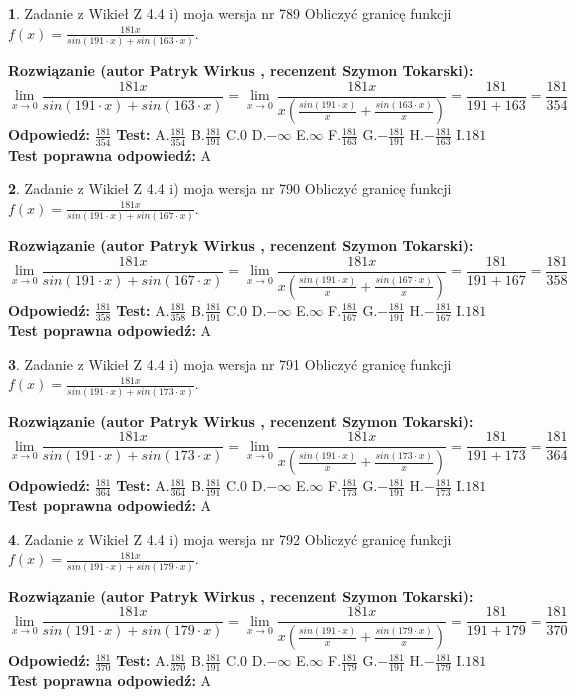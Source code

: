 \documentclass[12pt, a4paper]{article}
\theoremstyle{definition} %
\newtheorem{zad}{}
\newcommand{\zadStart}[1]{\begin{zad}#1\newline}
\newcommand{\zadStop}{\end{zad}}
\newcommand{\rozwStart}[2]{\noindent \textbf{Rozwiązanie (autor #1 , recenzent #2): }\newline}
\newcommand{\rozwStop}{\newline}
\newcommand{\odpStart}{\noindent \textbf{Odpowiedź:}\newline}
\newcommand{\odpStop}{\newline}
\newcommand{\testStart}{\noindent \textbf{Test:}\newline}
\newcommand{\testStop}{\newline}
\newcommand{\kluczStart}{\noindent \textbf{Test poprawna odpowiedź:}\newline}
\newcommand{\kluczStop}{\newline}
\begin{document}
\zadStart{Zadanie z Wikieł Z 4.4 i) moja wersja nr 789}
Obliczyć granicę funkcji $f(x)=\frac{181x}{sin(191\cdot x) +sin(163\cdot x)}$.
\zadStop
\rozwStart{Patryk Wirkus}{Szymon Tokarski}
$$\lim\limits_{x\to 0}\frac{181x}{sin(191\cdot x) +sin(163\cdot x)}=\lim\limits_{x\to 0}\frac{181x}{x(\frac{sin(191\cdot x)}{x}+\frac{sin(163\cdot x)}{x})}=\frac{181}{191+163} = \frac{181}{354}$$
\rozwStop
\odpStart
$\frac{181}{354}$
\odpStop
\testStart
A.$\frac{181}{354}$
B.$\frac{181}{191}$
C.$0$
D.$-\infty$
E.$\infty$
F.$\frac{181}{163}$
G.$-\frac{181}{191}$
H.$-\frac{181}{163}$
I.$181$
\testStop
\kluczStart
A
\kluczStop



\zadStart{Zadanie z Wikieł Z 4.4 i) moja wersja nr 790}
Obliczyć granicę funkcji $f(x)=\frac{181x}{sin(191\cdot x) +sin(167\cdot x)}$.
\zadStop
\rozwStart{Patryk Wirkus}{Szymon Tokarski}
$$\lim\limits_{x\to 0}\frac{181x}{sin(191\cdot x) +sin(167\cdot x)}=\lim\limits_{x\to 0}\frac{181x}{x(\frac{sin(191\cdot x)}{x}+\frac{sin(167\cdot x)}{x})}=\frac{181}{191+167} = \frac{181}{358}$$
\rozwStop
\odpStart
$\frac{181}{358}$
\odpStop
\testStart
A.$\frac{181}{358}$
B.$\frac{181}{191}$
C.$0$
D.$-\infty$
E.$\infty$
F.$\frac{181}{167}$
G.$-\frac{181}{191}$
H.$-\frac{181}{167}$
I.$181$
\testStop
\kluczStart
A
\kluczStop



\zadStart{Zadanie z Wikieł Z 4.4 i) moja wersja nr 791}
Obliczyć granicę funkcji $f(x)=\frac{181x}{sin(191\cdot x) +sin(173\cdot x)}$.
\zadStop
\rozwStart{Patryk Wirkus}{Szymon Tokarski}
$$\lim\limits_{x\to 0}\frac{181x}{sin(191\cdot x) +sin(173\cdot x)}=\lim\limits_{x\to 0}\frac{181x}{x(\frac{sin(191\cdot x)}{x}+\frac{sin(173\cdot x)}{x})}=\frac{181}{191+173} = \frac{181}{364}$$
\rozwStop
\odpStart
$\frac{181}{364}$
\odpStop
\testStart
A.$\frac{181}{364}$
B.$\frac{181}{191}$
C.$0$
D.$-\infty$
E.$\infty$
F.$\frac{181}{173}$
G.$-\frac{181}{191}$
H.$-\frac{181}{173}$
I.$181$
\testStop
\kluczStart
A
\kluczStop



\zadStart{Zadanie z Wikieł Z 4.4 i) moja wersja nr 792}
Obliczyć granicę funkcji $f(x)=\frac{181x}{sin(191\cdot x) +sin(179\cdot x)}$.
\zadStop
\rozwStart{Patryk Wirkus}{Szymon Tokarski}
$$\lim\limits_{x\to 0}\frac{181x}{sin(191\cdot x) +sin(179\cdot x)}=\lim\limits_{x\to 0}\frac{181x}{x(\frac{sin(191\cdot x)}{x}+\frac{sin(179\cdot x)}{x})}=\frac{181}{191+179} = \frac{181}{370}$$
\rozwStop
\odpStart
$\frac{181}{370}$
\odpStop
\testStart
A.$\frac{181}{370}$
B.$\frac{181}{191}$
C.$0$
D.$-\infty$
E.$\infty$
F.$\frac{181}{179}$
G.$-\frac{181}{191}$
H.$-\frac{181}{179}$
I.$181$
\testStop
\kluczStart
A
\kluczStop
\end{document}
